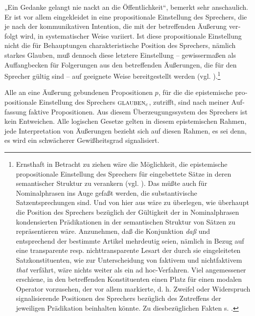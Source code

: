 \documentclass[output=paper]{langscibook}
\begin{document}
\begin{otherlanguage}{german}
„Ein Gedanke gelangt nie nackt an die Öffentlichkeit“, bemerkt \citet[209]{lang1979zum-status-der-satzadverbiale} sehr anschaulich. Er ist vor allem eingekleidet in eine propositionale Einstellung des Sprechers, die je nach der kommunikativen Intention, die mit der betreffenden Äußerung verfolgt wird, in systematischer Weise variiert. Ist diese propositionale Einstellung nicht die für Behauptungen charakteristische Position des Sprechers, nämlich starkes Glauben, muß dennoch diese letztere Einstellung -- gewissermaßen als Auffangbecken für Folgerungen aus den betreffenden Äußerungen, die für den Sprecher gültig sind -- auf geeignete Weise bereitgestellt werden (vgl. \citealt{morgan1969on-the-treatment-of-presupposition-in-transformational-grammar}).\footnote{Ernsthaft in Betracht zu ziehen wäre die Möglichkeit, die epistemische propositionale Einstellung des Sprechers für eingebettete Sätze in deren semantischer Struktur zu verankern (vgl. \citealt{zybatow1980uber-glaubensoperatoren}). Das müßte auch für Nominalphrasen ins Auge gefaßt werden, die substantivische Satzentsprechungen sind. Und von hier aus wäre zu überlegen, wie überhaupt die Position des Sprechers bezüglich der Gültigkeit der in Nominalphrasen kondensierten Prädikationen in der semantischen Struktur von Sätzen zu repräsentieren wäre. Anzunehmen, daß die Konjunktion \textit{daß} und entsprechend der bestimmte Artikel mehrdeutig seien, nämlich in Bezug auf eine transparente resp. nichttransparente Lesart der durch sie eingeleiteten Satzkonstituenten, wie \citet[166 ff.]{cresswell1973logics-and-languages} zur Unterscheidung von faktivem und nichtfaktivem \textit{that} verfährt, wäre nichts weiter als ein ad hoc-Verfahren. Viel angemessener erschiene, in den betreffenden Konstituenten einen Platz für einen modalen Operator vorzusehen, der vor allem markierte, d. h. Zweifel oder Widerspruch signalisierende Positionen des Sprechers bezüglich des Zutreffens der jeweiligen Prädikation beinhalten könnte. Zu diesbezüglichen Fakten s. \citet{zimmermann1978substantivverbande-als-satzentsprechungen-und-ihre-referentielle-bedeutung}.}

Alle an eine Äußerung gebundenen Propositionen $p$, für die die epistemische propositionale Einstellung des Sprechers $\textsc{glauben}_{c}$, zutrifft, sind nach meiner Auffassung faktive Propositionen. Aus diesem Überzeugungssystem des Spre\-chers ist kein Entweichen. Alle logischen Gesetze gelten in diesem epistemischen Rahmen, jede Interpretation von Äußerungen bezieht sich auf diesen Rahmen, es sei denn, es wird ein schwächerer Gewißheitsgrad signalisiert.


\end{otherlanguage}
\end{document}
